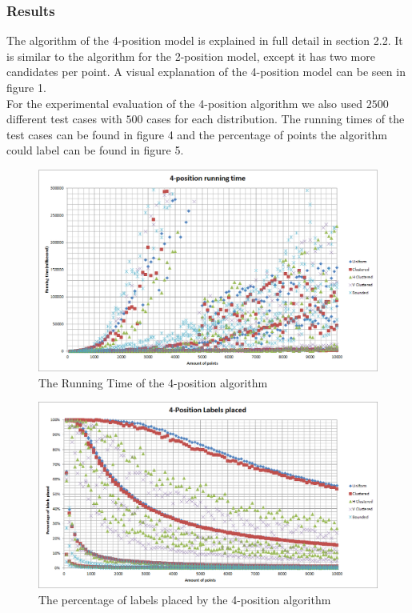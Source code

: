 \documentclass[crop=false,a4paper,oneside,11pt]{standalone}
\begin{document}
\subsubsection{Results}
The algorithm of the 4-position model is explained in full detail in section 2.2. It is similar to the algorithm for the 2-position model, except it has two more candidates per point. A visual explanation of the 4-position model can be seen in figure 1.\\
 For the experimental evaluation of the 4-position algorithm we also used $2500$ different test cases with $500$ cases for each distribution. The running times of the test cases can be found in figure 4 and the percentage of points the algorithm could label can be found in figure 5.\\

 \begin{figure}[H]
 \centering
 \centerline{\includegraphics[scale = 0.5]{4PosRunningTime.png}}
 \caption{The Running Time of the 4-position algorithm}
 \end{figure}

 \begin{figure}[H]
 \centering
  \centerline{\includegraphics[scale = 0.5]{4PosLabelsPlaced.png}}
  \caption{The percentage of labels placed by the 4-position algorithm}
 \end{figure}
\end{document}
